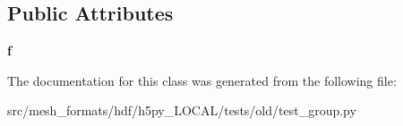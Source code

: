 \subsection*{Public Attributes}
\begin{DoxyCompactItemize}
\item 
\mbox{\label{classh5py__LOCAL_1_1tests_1_1old_1_1test__group_1_1BaseGroup_ae2a1411a2951963cbf628002801b1cd4}} 
{\bfseries f}
\end{DoxyCompactItemize}


The documentation for this class was generated from the following file\+:\begin{DoxyCompactItemize}
\item 
src/mesh\+\_\+formats/hdf/h5py\+\_\+\+L\+O\+C\+A\+L/tests/old/test\+\_\+group.\+py\end{DoxyCompactItemize}
